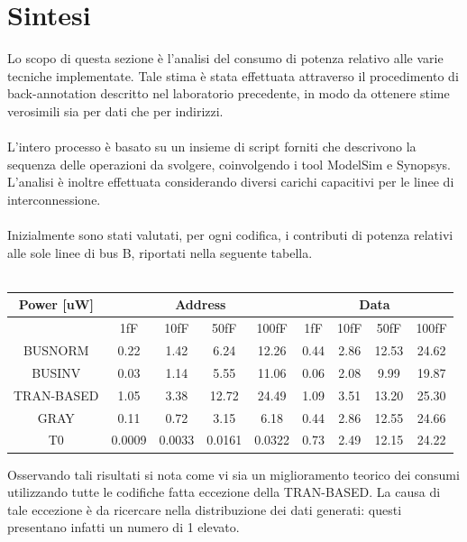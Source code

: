 \documentclass[11pt,  english, makeidx, a4paper, titlepage, oneside]{book}
\begin{document}
\section{Sintesi}
Lo scopo di questa sezione è l'analisi del consumo di potenza relativo alle varie tecniche implementate. Tale stima è stata effettuata attraverso il procedimento di back-annotation descritto nel laboratorio precedente, in modo da ottenere stime verosimili sia per dati che per indirizzi.
\\\\
L'intero processo è basato su un insieme di script forniti che descrivono la sequenza delle operazioni da svolgere, coinvolgendo i tool ModelSim e Synopsys. L'analisi è inoltre effettuata considerando diversi carichi capacitivi per le linee di interconnessione.
\\\\
Inizialmente sono stati valutati, per ogni codifica, i contributi di potenza relativi alle sole linee di bus B, riportati nella seguente tabella.
\\\\
\begin{center}
	\begin{tabular}{|c|c|c|c|c||c|c|c|c|}
	\hline
	Power [uW] & \multicolumn{4}{|c||}{Address} & \multicolumn{4}{|c|}{Data}\\
	\hline
	 & 1fF & 10fF & 50fF & 100fF & 1fF & 10fF & 50fF & 100fF \\
	\hline
	BUSNORM & 0.22 & 1.42 & 6.24 & 12.26 & 0.44 & 2.86 & 12.53 & 24.62 \\
	 \hline
	BUSINV & 0.03 & 1.14 & 5.55 & 11.06 & 0.06 & 2.08 & 9.99 & 19.87 \\
	\hline
	TRAN-BASED & 1.05 & 3.38 & 12.72 & 24.49 & 1.09 & 3.51 & 13.20 & 25.30 \\
	\hline
	GRAY & 0.11 & 0.72 & 3.15 & 6.18 & 0.44 & 2.86 & 12.55 & 24.66 \\
	\hline
	T0 & 0.0009 & 0.0033 & 0.0161 & 0.0322 & 0.73 & 2.49 & 12.15 & 24.22 \\
	\hline
	\end{tabular}	
\end{center}
\vspace{0.3cm}
Osservando tali risultati si nota come vi sia un miglioramento teorico dei consumi utilizzando tutte le codifiche fatta eccezione della TRAN-BASED. La causa di tale eccezione è da ricercare nella distribuzione dei dati generati: questi presentano infatti un numero di 1 elevato.
\\\\
\end{document}
